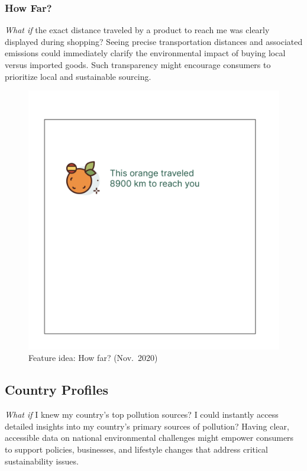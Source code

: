 \documentclass[
  12pt,
  letterpaper,
  DIV=11,
  numbers=noendperiod]{scrartcl}
\begin{document}
\subsubsection{How Far?}\label{how-far}

\emph{What if} the exact distance traveled by a product to reach me was
clearly displayed during shopping? Seeing precise transportation
distances and associated emissions could immediately clarify the
environmental impact of buying local versus imported goods. Such
transparency might encourage consumers to prioritize local and
sustainable sourcing.

\begin{figure}[H]

{\centering \includegraphics[width=0.5\linewidth,height=\textheight,keepaspectratio]{./images/prototypes/how-far.png}

}

\caption{Feature idea: How far? (Nov.~2020)}

\end{figure}%

\subsection{Country Profiles}\label{country-profiles}

\emph{What if} I knew my country's top pollution sources? I could
instantly access detailed insights into my country's primary sources of
pollution? Having clear, accessible data on national environmental
challenges might empower consumers to support policies, businesses, and
lifestyle changes that address critical sustainability issues.
\end{document}
